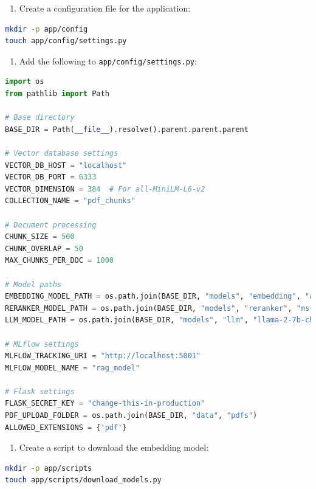 \documentclass[
  screen,review,acmlarge]{acmart}
\newcommand{\passthrough}[1]{#1}
\providecommand{\tightlist}{%
  \setlength{\itemsep}{0pt}\setlength{\parskip}{0pt}}
\begin{document}
\begin{enumerate}
\def\labelenumi{\arabic{enumi}.}
\tightlist
\item
  Create a configuration file for the application:
\end{enumerate}

\begin{lstlisting}[language=bash]
mkdir -p app/config
touch app/config/settings.py
\end{lstlisting}

\begin{enumerate}
\def\labelenumi{\arabic{enumi}.}
\setcounter{enumi}{1}
\tightlist
\item
  Add the following to \passthrough{\lstinline!app/config/settings.py!}:
\end{enumerate}

\begin{lstlisting}[language=Python]
import os
from pathlib import Path

# Base directory
BASE_DIR = Path(__file__).resolve().parent.parent.parent

# Vector database settings
VECTOR_DB_HOST = "localhost"
VECTOR_DB_PORT = 6333
VECTOR_DIMENSION = 384  # For all-MiniLM-L6-v2
COLLECTION_NAME = "pdf_chunks"

# Document processing
CHUNK_SIZE = 500
CHUNK_OVERLAP = 50
MAX_CHUNKS_PER_DOC = 1000

# Model paths
EMBEDDING_MODEL_PATH = os.path.join(BASE_DIR, "models", "embedding", "all-MiniLM-L6-v2")
RERANKER_MODEL_PATH = os.path.join(BASE_DIR, "models", "reranker", "ms-marco-MiniLM-L-6-v2")
LLM_MODEL_PATH = os.path.join(BASE_DIR, "models", "llm", "llama-2-7b-chat-q4_0.gguf")

# MLflow settings
MLFLOW_TRACKING_URI = "http://localhost:5001"
MLFLOW_MODEL_NAME = "rag_model"

# Flask settings
FLASK_SECRET_KEY = "change-this-in-production"
PDF_UPLOAD_FOLDER = os.path.join(BASE_DIR, "data", "pdfs")
ALLOWED_EXTENSIONS = {'pdf'}
\end{lstlisting}

\begin{enumerate}
\def\labelenumi{\arabic{enumi}.}
\setcounter{enumi}{2}
\tightlist
\item
  Create a script to download the embedding model:
\end{enumerate}

\begin{lstlisting}[language=bash]
mkdir -p app/scripts
touch app/scripts/download_models.py
\end{lstlisting}
\end{document}
